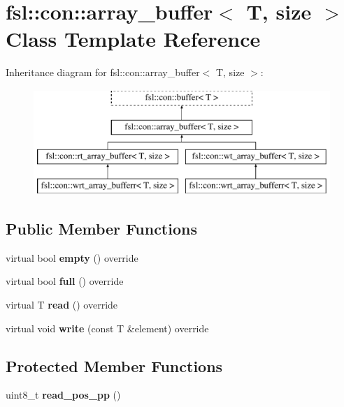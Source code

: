 \hypertarget{classfsl_1_1con_1_1array__buffer}{}\section{fsl\+::con\+::array\+\_\+buffer$<$ T, size $>$ Class Template Reference}
\label{classfsl_1_1con_1_1array__buffer}
Inheritance diagram for fsl\+::con\+::array\+\_\+buffer$<$ T, size $>$\+:\begin{figure}[H]
\begin{center}
\leavevmode
\includegraphics[height=4.000000cm]{classfsl_1_1con_1_1array__buffer}
\end{center}
\end{figure}
\subsection*{Public Member Functions}
\begin{DoxyCompactItemize}
\item 
\mbox{\label{classfsl_1_1con_1_1array__buffer_a77069ceb81486db69a38b2abd9467047}} 
virtual bool {\bfseries empty} () override
\item 
\mbox{\label{classfsl_1_1con_1_1array__buffer_a6fdc85f8d68eb4ced34ef6b01c549db0}} 
virtual bool {\bfseries full} () override
\item 
\mbox{\label{classfsl_1_1con_1_1array__buffer_ad1e5d01d03fc34a210899cf26096a556}} 
virtual T {\bfseries read} () override
\item 
\mbox{\label{classfsl_1_1con_1_1array__buffer_a89f1d8e0e77e459bd9e7bc0775e8309f}} 
virtual void {\bfseries write} (const T \&element) override
\end{DoxyCompactItemize}
\subsection*{Protected Member Functions}
\begin{DoxyCompactItemize}
\item 
\mbox{\label{classfsl_1_1con_1_1array__buffer_a732da4bd30d169d2d6bfb4d8eb1f8107}} 
uint8\+\_\+t {\bfseries read\+\_\+pos\+\_\+pp} ()
\end{DoxyCompactItemize}
